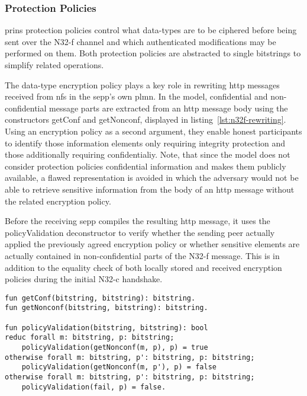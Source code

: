\subsubsection{Protection Policies}

\gls{prins} protection policies control what data-types are to be ciphered before being sent over the N32-f channel and which authenticated modifications may be performed on them.
Both protection policies are abstracted to single bitstrings to simplify related operations.

The data-type encryption policy plays a key role in rewriting \gls{http} messages received from \glspl{nf} in the \gls{sepp}'s own \gls{plmn}.
In the model, confidential and non-confidential message parts are extracted from an \gls{http} message body using the constructors {\sffamily getConf} and {\sffamily getNonconf}, displayed in listing~\ref{lst:n32f-rewriting}.
Using an encryption policy as a second argument, they enable honest participants to identify those information elements only requiring integrity protection and those additionally requiring confidentialiy.
Note, that since the model does not consider protection policies confidential information and makes them publicly available, a flawed representation is avoided in which the adversary would not be able to retrieve sensitive information from the body of an \gls{http} message without the related encryption policy.

Before the receiving \gls{sepp} compiles the resulting \gls{http} message, it uses the {\sffamily policyValidation} deconstructor to verify whether the sending peer actually applied the previously agreed encryption policy or whether sensitive elements are actually contained in non-confidential parts of the N32-f message.
This is in addition to the equality check of both locally stored and received encryption policies during the initial N32-c handshake.

\begin{lstlisting}[caption={N32-f Message Rewriting Functions},label={lst:n32f-rewriting},firstnumber=136]
fun getConf(bitstring, bitstring): bitstring.
fun getNonconf(bitstring, bitstring): bitstring.

fun policyValidation(bitstring, bitstring): bool
reduc forall m: bitstring, p: bitstring;
    policyValidation(getNonconf(m, p), p) = true
otherwise forall m: bitstring, p': bitstring, p: bitstring;
    policyValidation(getNonconf(m, p'), p) = false
otherwise forall m: bitstring, p': bitstring, p: bitstring;
    policyValidation(fail, p) = false.
\end{lstlisting}

